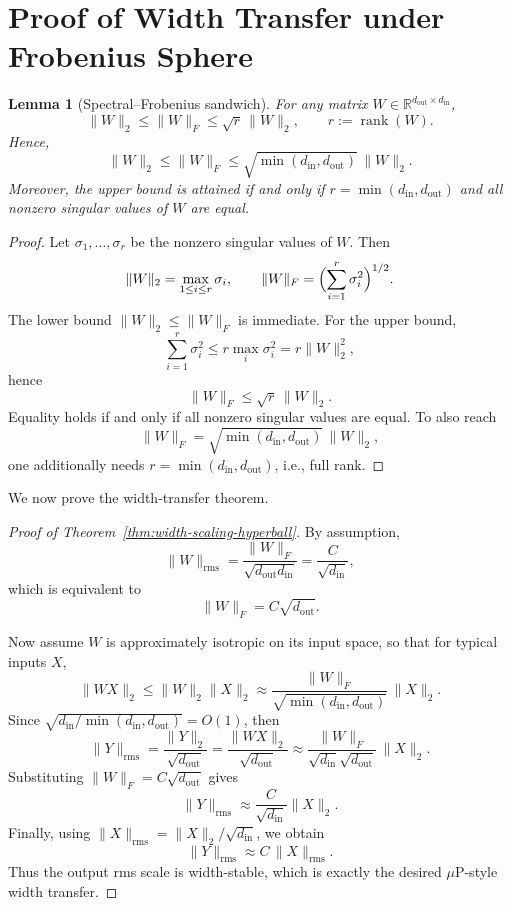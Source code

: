 \documentclass{article}
\newtheorem{lemma}[theorem]{Lemma}
\begin{document}
{\small



}

\appendix


\section{Proof of Width Transfer under Frobenius Sphere}
\label{app:width-scaling-proof}
\begin{lemma}[Spectral--Frobenius sandwich]
\label{lem:spectral-frobenius-sandwich}
For any matrix $W \in \mathbb{R}^{d_{\mathrm{out}}\times d_{\mathrm{in}}}$,
\[
\|W\|_2 \le \|W\|_F \le \sqrt{r}\,\|W\|_2,
\qquad
r:=\operatorname{rank}(W).
\]
Hence,
\[
\|W\|_2 \le \|W\|_F \le
\sqrt{\min(d_{\mathrm{in}},d_{\mathrm{out}})}\,\|W\|_2.
\]
Moreover, the upper bound is attained if and only if
$r=\min(d_{\mathrm{in}},d_{\mathrm{out}})$ and all nonzero singular values of
$W$ are equal.
\end{lemma}

\begin{proof}
Let $\sigma_1,\dots,\sigma_r$ be the nonzero singular values of $W$. Then
\[
\|W\|_2 = \max_{1\le i\le r}\sigma_i,
\qquad
\|W\|_F = \Bigl(\sum_{i=1}^r \sigma_i^2\Bigr)^{1/2}.
\]
The lower bound $\|W\|_2 \le \|W\|_F$ is immediate. For the upper bound,
\[
\sum_{i=1}^r \sigma_i^2 \le r \max_i \sigma_i^2 = r\|W\|_2^2,
\]
hence
\[
\|W\|_F \le \sqrt{r}\,\|W\|_2.
\]
Equality holds if and only if all nonzero singular values are equal. To also
reach
\[
\|W\|_F = \sqrt{\min(d_{\mathrm{in}},d_{\mathrm{out}})}\,\|W\|_2,
\]
one additionally needs $r=\min(d_{\mathrm{in}},d_{\mathrm{out}})$, i.e.,
full rank.
\end{proof}

We now prove the width-transfer theorem.

\begin{proof}[Proof of Theorem~\ref{thm:width-scaling-hyperball}]
By assumption,
\[
\|W\|_{\mathrm{rms}} = \frac{\|W\|_F}{\sqrt{d_{\mathrm{out}}d_{\mathrm{in}}}}
= \frac{C}{\sqrt{d_{\mathrm{in}}}},
\]
which is equivalent to
\[
\|W\|_F = C\sqrt{d_{\mathrm{out}}}.
\]

Now assume $W$ is approximately isotropic on its input space, so that for
typical inputs $X$,
\[
\|WX\|_2  \le \|W\|_2 \|X\|_2 \approx \frac{\|W\|_F}{\sqrt{\min(d_{\mathrm{in}},d_{\mathrm{out}})}}\,\|X\|_2.
\]
Since $\sqrt{d_{\mathrm{in}}/ \min(d_{\mathrm{in}},d_{\mathrm{out}})} = O(1)$, then
\[
\|Y\|_{\mathrm{rms}}
=
\frac{\|Y\|_2}{\sqrt{d_{\mathrm{out}}}}
=
\frac{\|WX\|_2}{\sqrt{d_{\mathrm{out}}}}
\approx
\frac{\|W\|_F}{\sqrt{d_{\mathrm{in}}}\sqrt{d_{\mathrm{out}}}}\,\|X\|_2.
\]
Substituting $\|W\|_F=C\sqrt{d_{\mathrm{out}}}$ gives
\[
\|Y\|_{\mathrm{rms}}
\approx
\frac{C}{\sqrt{d_{\mathrm{in}}}}\|X\|_2.
\]
Finally, using $\|X\|_{\mathrm{rms}}=\|X\|_2/\sqrt{d_{\mathrm{in}}}$, we obtain
\[
\|Y\|_{\mathrm{rms}}
\approx
C\,\|X\|_{\mathrm{rms}}.
\]
Thus the output rms scale is width-stable, which is exactly the desired
$\mu$P-style width transfer.
\end{proof}
\end{document}
